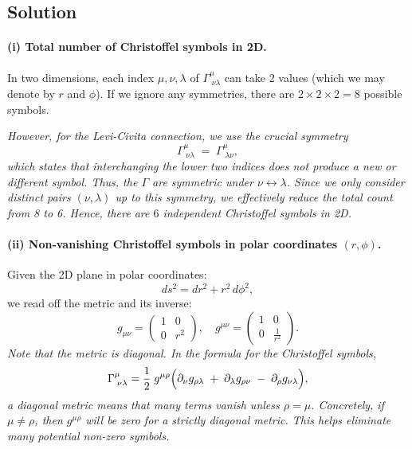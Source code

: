 \documentclass{article}
\begin{document}
\subsection*{Solution}

\paragraph{(i) Total number of Christoffel symbols in 2D.}

In two dimensions, each index \(\mu,\nu,\lambda\) of \(\Gamma^\mu_{\;\nu\lambda}\) can take 2 values (which we may denote by \(r\) and \(\phi\)). If we ignore any symmetries, there are \(2 \times 2 \times 2 = 8\) possible symbols.

\emph{However, for the Levi-Civita connection, we use the crucial symmetry}
\[
\Gamma^\mu_{\;\nu\lambda} \;=\; \Gamma^\mu_{\;\lambda\nu},
\]
\emph{which states that interchanging the lower two indices does not produce a new or different symbol. Thus, the \(\Gamma\) are symmetric under \(\nu \leftrightarrow \lambda\). Since we only consider distinct pairs \((\nu,\lambda)\) up to this symmetry, we effectively reduce the total count from 8 to 6. Hence, there are \(\boxed{6}\) independent Christoffel symbols in 2D.}

\paragraph{(ii) Non-vanishing Christoffel symbols in polar coordinates \((r,\phi)\).}

Given the 2D plane in polar coordinates:
\[
ds^2 = dr^2 + r^2\,d\phi^2,
\]
we read off the metric and its inverse:
\[
g_{\mu\nu}
=
\begin{pmatrix}
1 & 0 \\
0 & r^2
\end{pmatrix},
\quad
g^{\mu\nu}
=
\begin{pmatrix}
1 & 0 \\
0 & \frac{1}{r^2}
\end{pmatrix}.
\]
\emph{Note that the metric is diagonal. In the formula for the Christoffel symbols,}
\[
\Gamma^\mu_{\;\nu\lambda}
=
\frac{1}{2}\;g^{\mu\rho}
\Bigl(
\partial_\nu g_{\rho\lambda}
\;+\;
\partial_\lambda g_{\rho\nu}
\;-\;
\partial_\rho g_{\nu\lambda}
\Bigr),
\]
\emph{a diagonal metric means that many terms vanish unless \(\rho = \mu\). Concretely, if \(\mu\neq\rho\), then \(g^{\mu\rho}\) will be zero for a strictly diagonal metric. This helps eliminate many potential non-zero symbols.}
\end{document}
